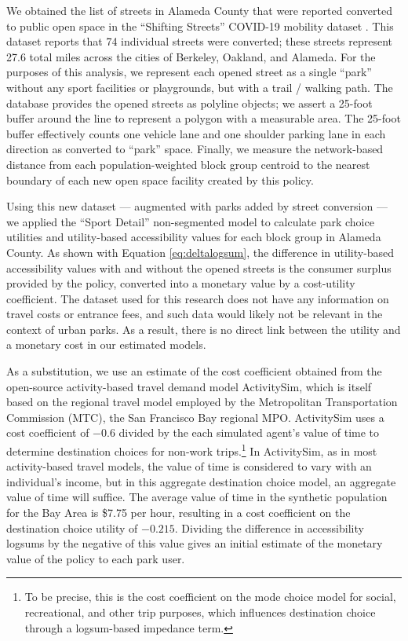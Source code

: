\documentclass[3p, authoryear, review]{elsarticle} %
\begin{document}
We obtained the list of streets in Alameda County that were reported converted to
public open space
in the ``Shifting Streets'' COVID-19 mobility dataset \citep{slowstreets}. This dataset
reports that 74 individual streets were converted; these streets represent
27.6 total miles across the cities
of Berkeley, Oakland, and Alameda. For the purposes of this analysis, we
represent each opened street as a single ``park'' without any sport facilities or
playgrounds, but with a trail / walking path. The database provides the opened
streets as polyline objects; we assert a 25-foot buffer around the line to
represent a polygon with a measurable area. The 25-foot buffer effectively counts
one vehicle lane and one shoulder parking lane in each direction as converted to
``park'' space. Finally, we measure the network-based distance from each
population-weighted block group centroid to the nearest boundary of each new
open space facility created by this policy.

Using this new dataset --- augmented with parks added by street conversion --- we
applied the ``Sport Detail'' non-segmented model to calculate park choice utilities
and utility-based accessibility values for each block group in Alameda County.
As shown with Equation \eqref{eq:deltalogsum}, the difference in utility-based
accessibility values with and without the opened streets is the consumer
surplus provided by the policy, converted into a monetary value by a
cost-utility coefficient. The dataset used for this research does
not have any information on travel costs or entrance fees, and such data would
likely not be relevant in the context of urban parks. As a result, there is no
direct link between the utility and a monetary cost in our estimated models.

As a substitution, we use an estimate of the cost coefficient obtained from the
open-source activity-based travel demand model ActivitySim, which is itself
based on the regional travel model employed by the Metropolitan
Transportation Commission (MTC), the San Francisco Bay regional MPO.
ActivitySim uses a cost coefficient of
\(-0.6\) divided by the each simulated agent's value of time to determine
destination choices for non-work trips.\footnote{To be precise, this is the cost
  coefficient on the mode choice model for social, recreational, and other trip
  purposes, which influences destination choice through a logsum-based impedance
  term.} In ActivitySim, as in most activity-based travel models, the value of
time is considered to vary with an individual's income, but in this aggregate
destination choice model, an aggregate value of time will suffice. The average
value of time in the synthetic population for the Bay Area is \$7.75
per hour, resulting in a cost coefficient on the destination choice utility of
\(-0.215\). Dividing the difference in accessibility logsums by the negative of
this value gives an initial estimate of the monetary value of the policy
to each park user.
\end{document}

